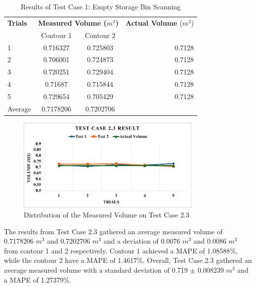 \begin{table}[H]
	\centering
	\caption{Results of Test Case 1: Empty Storage Bin Scanning}
	\label{table:test_case_1_results}
	\begin{tabular}{l c c r}
		\toprule
		\textbf{Trials} & \multicolumn{2}{c}{\textbf{Measured Volume ($m^{3}$)}} & \textbf{Actual Volume} ($m^{3}$)          \\
		{}              & Contour 1                                              & Contour 2                        & {}     \\ \midrule
		1               & 0.716327                                               & 0.725803                         & 0.7128 \\
		2               & 0.706001                                               & 0.724873                         & 0.7128 \\
		3               & 0.720251                                               & 0.729404                         & 0.7128 \\
		4               & 0.71687                                                & 0.715844                         & 0.7128 \\
		5               & 0.729654                                               & 0.705429                         & 0.7128 \\ \midrule
		Average         & 0.7178206                                              & 0.7202706                        & {}     \\ \bottomrule
	\end{tabular}
\end{table}

\begin{figure}[H]
	\centering
	\includegraphics[width=0.8\textwidth]{Figures/test-case-2-3-graph}
	\caption{Distribution of the Measured Volume on Test Case 2.3}
	\label{ch4:fig:test-case-2-3-graph}
\end{figure}


The results from Test Case 2.3 gathered an average measured volume of 0.7178206 $m^{3}$ and 0.7202706 $m^{3}$ and a deviation of 0.0076 $m^{3}$ and 0.0086 $m^{3}$ from contour 1 and 2 respectively. Contour 1 achieved a MAPE of 1.08588\%, while the contour 2 have a MAPE of 1.4617\%. Overall, Test Case 2.3 gathered an average measured volume with a standard deviation of 0.719 $\pm$ 0.008239 $m^{3}$ and a MAPE of 1.27379\%.

